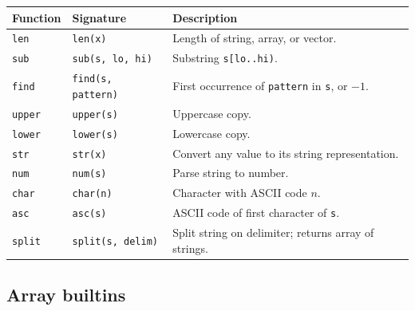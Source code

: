 \documentclass[11pt,a4paper]{article}
\begin{document}
\begin{longtable}{@{}L{3.2cm}L{4.2cm}L{7.3cm}@{}}
\toprule
\textbf{Function} & \textbf{Signature} & \textbf{Description} \\
\midrule
\endhead
\texttt{len}      & \texttt{len(x)}               & Length of string, array, or vector. \\
\texttt{sub}      & \texttt{sub(s, lo, hi)}        & Substring \texttt{s[lo..hi)}. \\
\texttt{find}     & \texttt{find(s, pattern)}      & First occurrence of \texttt{pattern} in \texttt{s}, or $-1$. \\
\texttt{upper}    & \texttt{upper(s)}              & Uppercase copy. \\
\texttt{lower}    & \texttt{lower(s)}              & Lowercase copy. \\
\texttt{str}      & \texttt{str(x)}               & Convert any value to its string representation. \\
\texttt{num}      & \texttt{num(s)}               & Parse string to number. \\
\texttt{char}     & \texttt{char(n)}              & Character with ASCII code $n$. \\
\texttt{asc}      & \texttt{asc(s)}               & ASCII code of first character of \texttt{s}. \\
\texttt{split}    & \texttt{split(s, delim)}       & Split string on delimiter; returns array of strings. \\
\bottomrule
\end{longtable}

\subsection{Array builtins}
\end{document}
